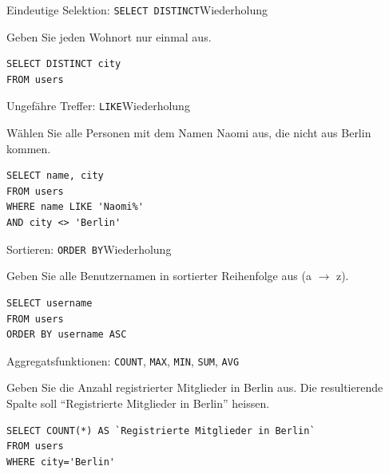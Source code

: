 \begin{frame}[fragile]{Eindeutige Selektion: \lstinline|SELECT DISTINCT|}{Wiederholung}
  \small
  \begin{myexercise}
    Geben Sie jeden Wohnort nur einmal aus.
    \pause
    \begin{myanswer}
      \begin{lstlisting}
SELECT DISTINCT city
FROM users
\end{lstlisting}
    \end{myanswer}
  \end{myexercise}
\end{frame}

\begin{frame}[fragile]{Ungefähre Treffer: \lstinline|LIKE|}{Wiederholung}
  \begin{myexercise}
    Wählen Sie alle Personen mit dem Namen Naomi aus, die nicht aus Berlin kommen.
    \pause
    \begin{myanswer}
      \begin{lstlisting}
SELECT name, city
FROM users
WHERE name LIKE 'Naomi%'
AND city <> 'Berlin'
\end{lstlisting}
    \end{myanswer}
  \end{myexercise}
\end{frame}

\begin{frame}[fragile]{Sortieren: \lstinline|ORDER BY|}{Wiederholung}
  \begin{myexercise}
    Geben Sie alle Benutzernamen in sortierter Reihenfolge aus (a $\rightarrow$ z).
    \pause
    \begin{myanswer}
      \begin{lstlisting}
SELECT username
FROM users
ORDER BY username ASC
\end{lstlisting}
    \end{myanswer}
  \end{myexercise}
\end{frame}

\begin{frame}[fragile]{Aggregatsfunktionen: \lstinline|COUNT|, \lstinline|MAX|, \lstinline|MIN|, \lstinline|SUM|, \lstinline|AVG|}
  \begin{myexercise}
    Geben Sie die Anzahl registrierter Mitglieder in Berlin aus. Die resultierende Spalte soll \enquote{Registrierte Mitglieder in Berlin} heissen.
    \pause
    \begin{myanswer}
      \begin{lstlisting}
SELECT COUNT(*) AS `Registrierte Mitglieder in Berlin`
FROM users
WHERE city='Berlin'
\end{lstlisting}
    \end{myanswer}
  \end{myexercise}
\end{frame}


